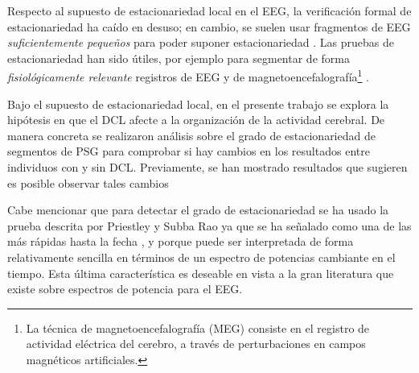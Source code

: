 \documentclass[12pt,letterpaper]{book}
\begin{document}

Respecto al supuesto de estacionariedad local en el EEG, la verificación formal de estacionariedad ha caído en desuso; en cambio, se suelen usar fragmentos de EEG \textit{suficientemente pequeños} para poder suponer estacionariedad \cite{Kaiser00}. %
%
Las pruebas de estacionariedad han sido útiles, por ejemplo
para segmentar de forma \textit{fisiológicamente relevante} registros de EEG \cite{Kaplan99} y de magnetoencefalografía\footnote{La técnica de magnetoencefalografía (MEG) consiste en el registro de actividad eléctrica del cerebro, a través de perturbaciones en campos magnéticos artificiales.} \cite{lazyref1}.

Bajo el supuesto de estacionariedad local, en el presente trabajo se explora la hipótesis en que el DCL afecte a la organización de la actividad cerebral.
%
De manera concreta se realizaron análisis sobre el grado de estacionariedad de segmentos de PSG para comprobar si hay cambios en los resultados entre individuos con y sin DCL.
%
Previamente, se han mostrado resultados que sugieren es posible observar tales cambios

Cabe mencionar que para detectar el grado de estacionariedad se ha usado la prueba
descrita
por Priestley y Subba Rao \cite{Priestley69} ya que se ha señalado como una de las más rápidas hasta la fecha \cite{Nason13}, y porque puede ser interpretada de forma relativamente sencilla en términos de un espectro de potencias cambiante en el tiempo. 
%
Esta última característica es deseable en vista a la gran literatura que existe sobre espectros de potencia para el EEG.
\end{document}
